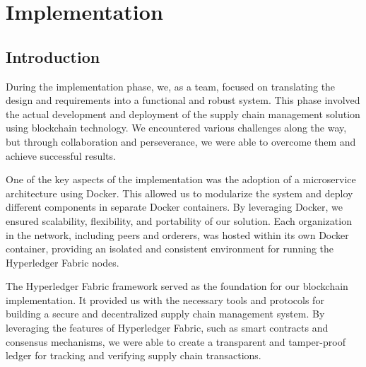 
\chapter{Implementation}\doublespacing %

\label{Chapter6} %



\section{Introduction}
During the implementation phase, we, as a team, focused on translating the design and requirements into a functional and robust system. This phase involved the actual development and deployment of the supply chain management solution using blockchain technology. We encountered various challenges along the way, but through collaboration and perseverance, we were able to overcome them and achieve successful results.
\par One of the key aspects of the implementation was the adoption of a microservice architecture using Docker. This allowed us to modularize the system and deploy different components in separate Docker containers. By leveraging Docker, we ensured scalability, flexibility, and portability of our solution. Each organization in the network, including peers and orderers, was hosted within its own Docker container, providing an isolated and consistent environment for running the Hyperledger Fabric nodes.
\par The Hyperledger Fabric framework served as the foundation for our blockchain implementation. It provided us with the necessary tools and protocols for building a secure and decentralized supply chain management system. By leveraging the features of Hyperledger Fabric, such as smart contracts and consensus mechanisms, we were able to create a transparent and tamper-proof ledger for tracking and verifying supply chain transactions.




